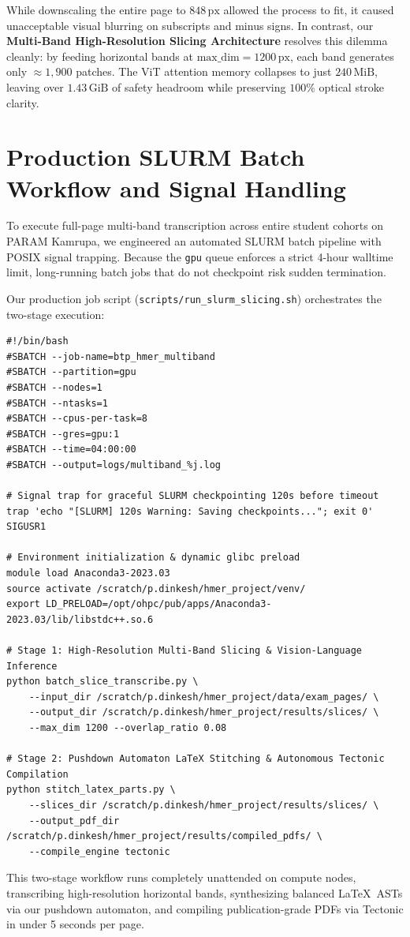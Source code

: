 While downscaling the entire page to $848\,\text{px}$ allowed the process to fit, it caused unacceptable visual blurring on subscripts and minus signs. In contrast, our \textbf{Multi-Band High-Resolution Slicing Architecture} resolves this dilemma cleanly: by feeding horizontal bands at $\text{max\_dim} = 1200\,\text{px}$, each band generates only $\approx 1,900$ patches. The ViT attention memory collapses to just $240\,\text{MiB}$, leaving over $1.43\,\text{GiB}$ of safety headroom while preserving $100\%$ optical stroke clarity.

\section{Production SLURM Batch Workflow and Signal Handling}
\label{sec:slurm_pipeline}

To execute full-page multi-band transcription across entire student cohorts on PARAM Kamrupa, we engineered an automated SLURM batch pipeline with POSIX signal trapping. Because the \texttt{gpu} queue enforces a strict 4-hour walltime limit, long-running batch jobs that do not checkpoint risk sudden termination.

Our production job script (\texttt{scripts/run\_slurm\_slicing.sh}) orchestrates the two-stage execution:
\begin{footnotesize}
\begin{verbatim}
#!/bin/bash
#SBATCH --job-name=btp_hmer_multiband
#SBATCH --partition=gpu
#SBATCH --nodes=1
#SBATCH --ntasks=1
#SBATCH --cpus-per-task=8
#SBATCH --gres=gpu:1
#SBATCH --time=04:00:00
#SBATCH --output=logs/multiband_%j.log

# Signal trap for graceful SLURM checkpointing 120s before timeout
trap 'echo "[SLURM] 120s Warning: Saving checkpoints..."; exit 0' SIGUSR1

# Environment initialization & dynamic glibc preload
module load Anaconda3-2023.03
source activate /scratch/p.dinkesh/hmer_project/venv/
export LD_PRELOAD=/opt/ohpc/pub/apps/Anaconda3-2023.03/lib/libstdc++.so.6

# Stage 1: High-Resolution Multi-Band Slicing & Vision-Language Inference
python batch_slice_transcribe.py \
    --input_dir /scratch/p.dinkesh/hmer_project/data/exam_pages/ \
    --output_dir /scratch/p.dinkesh/hmer_project/results/slices/ \
    --max_dim 1200 --overlap_ratio 0.08

# Stage 2: Pushdown Automaton LaTeX Stitching & Autonomous Tectonic Compilation
python stitch_latex_parts.py \
    --slices_dir /scratch/p.dinkesh/hmer_project/results/slices/ \
    --output_pdf_dir /scratch/p.dinkesh/hmer_project/results/compiled_pdfs/ \
    --compile_engine tectonic
\end{verbatim}
\end{footnotesize}
This two-stage workflow runs completely unattended on compute nodes, transcribing high-resolution horizontal bands, synthesizing balanced \LaTeX\ ASTs via our pushdown automaton, and compiling publication-grade PDFs via Tectonic in under 5 seconds per page.
